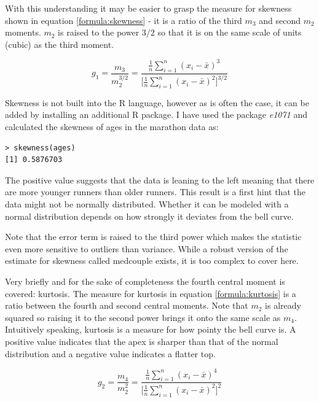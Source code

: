 \documentclass{tufte-book} %
\begin{document}
With this understanding it may be easier to grasp the measure for skewness shown in equation \ref{formula:skewness} - it is a ratio of the third $m_3$ and second $m_2$ moments. $m_2$ is raised to the power $3/2$ so that it is on the same scale of units (cubic) as the third moment. 

\begin{equation} \label{formula:skewness}
	g_1 = \frac{m_3}{m_2^{3/2}} = 
	\frac{\frac{1}{n}\sum_{i=1}^{n}(x_i - \bar{x})^3}
	{\Big[\frac{1}{n}\sum_{i=1}^{n}(x_i - \bar{x})^2\Big]^{3/2}}
\end{equation}

Skewness is not built into the R language, however as is often the case, it can be added by installing an additional R package. I have used the package {\em e1071} and calculated the skewness of ages in the marathon data as:

\begin{Verbatim}
> skewness(ages)
[1] 0.5876703
\end{Verbatim}

The positive value suggests that the data is leaning to the left meaning that there are more younger runners than older runners. This result is a first hint that the data might not be normally distributed. Whether it can be modeled with a normal distribution depends on how strongly it deviates from the bell curve.

Note that the error term is raised to the third power which makes the statistic even more sensitive to outliers than variance. While a robust version of the estimate for skewness called medcouple\cite{Brys2004} exists, it is  too complex to cover here.

Very briefly and for the sake of completeness the fourth central moment is covered: kurtosis. The measure for kurtosis in equation \ref{formula:kurtosis} is a ratio between the fourth and second central moments. Note that $m_2$ is already squared so raising it to the second power brings it onto the same scale as $m_4$. Intuitively speaking, kurtosis is a measure for how pointy the bell curve is. A positive value indicates that the apex is sharper than that of the normal distribution and a negative value indicates a flatter top.

\begin{equation} \label{formula:kurtosis}
	g_2 = \frac{m_4}{m_2^{2}} = 
	\frac{\frac{1}{n}\sum_{i=1}^{n}(x_i - \bar{x})^4}
	{\Big[\frac{1}{n}\sum_{i=1}^{n}(x_i - \bar{x})^2\Big]^{2}}
\end{equation}
\end{document}
